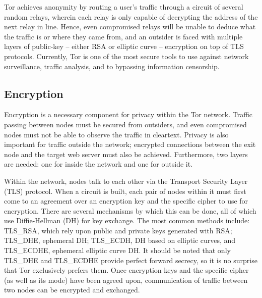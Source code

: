 \documentclass[journal]{IEEEtran}
\begin{document}
Tor achieves anonymity by routing a user's traffic through a circuit of several random relays, wherein each relay is only capable of decrypting the address of the next relay in line. Hence, even compromised relays will be unable to deduce what the traffic is or where they came from, and an outsider is faced with multiple layers of public-key -- either RSA or elliptic curve -- encryption on top of TLS protocols. Currently, Tor is one of the most secure tools to use against network surveillance, traffic analysis, and to bypassing information censorship.

\subsection{Encryption}

Encryption is a necessary component for privacy within the Tor network. Traffic passing between nodes must be secured from outsiders, and even compromised nodes must not be able to observe the traffic in cleartext. Privacy is also important for traffic outside the network; encrypted connections between the exit node and the target web server must also be achieved. Furthermore, two layers are needed: one for inside the network and one for outside it.

Within the network, nodes talk to each other via the Transport Security Layer (TLS) protocol. When a circuit is built, each pair of nodes within it must first come to an agreement over an encryption key and the specific cipher to use for encryption. There are several mechanisms by which this can be done, all of which use Diffie-Hellman (DH) for key exchange. The most common methods include: TLS\_RSA, which rely upon public and private keys generated with RSA; TLS\_DHE, ephemeral DH; TLS\_ECDH, DH based on elliptic curves, and TLS\_ECDHE, ephemeral elliptic curve DH. It should be noted that only TLS\_DHE and TLS\_ECDHE provide perfect forward secrecy, so it is no surprise that Tor exclusively prefers them. Once encryption keys and the specific cipher (as well as its mode) have been agreed upon, communication of traffic between two nodes can be encrypted and exchanged.

\end{document}

